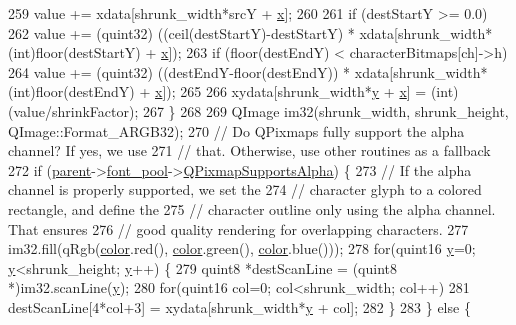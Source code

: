 \begin{DoxyCode}
{259             value += xdata[shrunk\_width*srcY + \hyperlink{classglyph_aa030c1619dd07d04f843c5ee9a54dde1}{x}];
260 
261         \textcolor{keywordflow}{if} (destStartY >= 0.0)
262           value += (quint32) ((ceil(destStartY)-destStartY) * xdata[shrunk\_width*(\textcolor{keywordtype}{int})floor(destStartY) + 
      \hyperlink{classglyph_aa030c1619dd07d04f843c5ee9a54dde1}{x}]);
263         \textcolor{keywordflow}{if} (floor(destEndY) < characterBitmaps[ch]->h)
264           value += (quint32) ((destEndY-floor(destEndY)) * xdata[shrunk\_width*(\textcolor{keywordtype}{int})floor(destEndY) + 
      \hyperlink{classglyph_aa030c1619dd07d04f843c5ee9a54dde1}{x}]);
265 
266         xydata[shrunk\_width*\hyperlink{classglyph_ac9b8f10a7be77024f34c723eeea34bf3}{y} + \hyperlink{classglyph_aa030c1619dd07d04f843c5ee9a54dde1}{x}] = (int)(value/shrinkFactor);
267       \}
268 
269     QImage im32(shrunk\_width, shrunk\_height, QImage::Format\_ARGB32);
270     \textcolor{comment}{// Do QPixmaps fully support the alpha channel? If yes, we use}
271     \textcolor{comment}{// that. Otherwise, use other routines as a fallback}
272     \textcolor{keywordflow}{if} (\hyperlink{classTeXFont_a72d8eb1f0377749cf4a45dfabf1c3dd5}{parent}->\hyperlink{classTeXFontDefinition_abc8dfc7c07e8d998150e4ab09f9f9bec}{font\_pool}->\hyperlink{classfontPool_af02ca5badcfd15a93f871606867909b7}{QPixmapSupportsAlpha}) \{
273       \textcolor{comment}{// If the alpha channel is properly supported, we set the}
274       \textcolor{comment}{// character glyph to a colored rectangle, and define the}
275       \textcolor{comment}{// character outline only using the alpha channel. That ensures}
276       \textcolor{comment}{// good quality rendering for overlapping characters.}
277       im32.fill(qRgb(\hyperlink{classglyph_ab4847af7a7b13322d5651fe47735c8dd}{color}.red(), \hyperlink{classglyph_ab4847af7a7b13322d5651fe47735c8dd}{color}.green(), \hyperlink{classglyph_ab4847af7a7b13322d5651fe47735c8dd}{color}.blue()));
278       \textcolor{keywordflow}{for}(quint16 \hyperlink{classglyph_ac9b8f10a7be77024f34c723eeea34bf3}{y}=0; \hyperlink{classglyph_ac9b8f10a7be77024f34c723eeea34bf3}{y}<shrunk\_height; \hyperlink{classglyph_ac9b8f10a7be77024f34c723eeea34bf3}{y}++) \{
279         quint8 *destScanLine = (quint8 *)im32.scanLine(\hyperlink{classglyph_ac9b8f10a7be77024f34c723eeea34bf3}{y});
280         \textcolor{keywordflow}{for}(quint16 col=0; col<shrunk\_width; col++)
281           destScanLine[4*col+3] = xydata[shrunk\_width*\hyperlink{classglyph_ac9b8f10a7be77024f34c723eeea34bf3}{y} + col];
282       \}
283     \} \textcolor{keywordflow}{else} \{
}
\end{DoxyCode}
